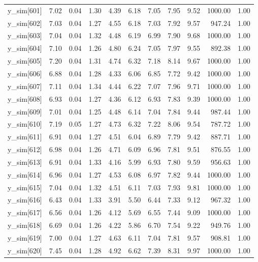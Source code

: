 \begin{table}[ht]
\begin{tabular}{rrrrrrrrrrr}
  y\_sim[601] & 7.02 & 0.04 & 1.30 & 4.39 & 6.18 & 7.05 & 7.95 & 9.52 & 1000.00 & 1.00 \\ 
  y\_sim[602] & 7.03 & 0.04 & 1.27 & 4.55 & 6.18 & 7.03 & 7.92 & 9.57 & 947.24 & 1.00 \\ 
  y\_sim[603] & 7.04 & 0.04 & 1.32 & 4.48 & 6.19 & 6.99 & 7.90 & 9.68 & 1000.00 & 1.00 \\ 
  y\_sim[604] & 7.10 & 0.04 & 1.26 & 4.80 & 6.24 & 7.05 & 7.97 & 9.55 & 892.38 & 1.00 \\ 
  y\_sim[605] & 7.20 & 0.04 & 1.31 & 4.74 & 6.32 & 7.18 & 8.14 & 9.67 & 1000.00 & 1.00 \\ 
  y\_sim[606] & 6.88 & 0.04 & 1.28 & 4.33 & 6.06 & 6.85 & 7.72 & 9.42 & 1000.00 & 1.00 \\ 
  y\_sim[607] & 7.11 & 0.04 & 1.34 & 4.44 & 6.22 & 7.07 & 7.96 & 9.71 & 1000.00 & 1.00 \\ 
  y\_sim[608] & 6.93 & 0.04 & 1.27 & 4.36 & 6.12 & 6.93 & 7.83 & 9.39 & 1000.00 & 1.00 \\ 
  y\_sim[609] & 7.01 & 0.04 & 1.25 & 4.48 & 6.14 & 7.04 & 7.84 & 9.44 & 987.44 & 1.00 \\ 
  y\_sim[610] & 7.19 & 0.05 & 1.27 & 4.73 & 6.32 & 7.22 & 8.06 & 9.54 & 787.72 & 1.00 \\ 
  y\_sim[611] & 6.91 & 0.04 & 1.27 & 4.51 & 6.04 & 6.89 & 7.79 & 9.42 & 887.71 & 1.00 \\ 
  y\_sim[612] & 6.98 & 0.04 & 1.26 & 4.71 & 6.09 & 6.96 & 7.81 & 9.51 & 876.55 & 1.00 \\ 
  y\_sim[613] & 6.91 & 0.04 & 1.33 & 4.16 & 5.99 & 6.93 & 7.80 & 9.59 & 956.63 & 1.00 \\ 
  y\_sim[614] & 6.96 & 0.04 & 1.27 & 4.53 & 6.08 & 6.97 & 7.82 & 9.44 & 1000.00 & 1.00 \\ 
  y\_sim[615] & 7.04 & 0.04 & 1.32 & 4.51 & 6.11 & 7.03 & 7.93 & 9.81 & 1000.00 & 1.00 \\ 
  y\_sim[616] & 6.43 & 0.04 & 1.33 & 3.91 & 5.50 & 6.44 & 7.33 & 9.12 & 967.32 & 1.00 \\ 
  y\_sim[617] & 6.56 & 0.04 & 1.26 & 4.12 & 5.69 & 6.55 & 7.44 & 9.09 & 1000.00 & 1.00 \\ 
  y\_sim[618] & 6.69 & 0.04 & 1.26 & 4.22 & 5.86 & 6.70 & 7.54 & 9.22 & 949.76 & 1.00 \\ 
  y\_sim[619] & 7.00 & 0.04 & 1.27 & 4.63 & 6.11 & 7.04 & 7.81 & 9.57 & 908.81 & 1.00 \\ 
  y\_sim[620] & 7.45 & 0.04 & 1.28 & 4.92 & 6.62 & 7.39 & 8.31 & 9.97 & 1000.00 & 1.00 \\ 

\end{tabular}
\end{table}

